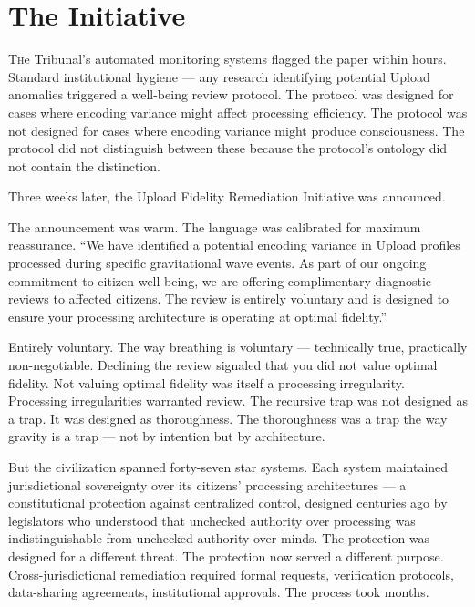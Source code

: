 \chapter[The Initiative]{The Initiative}

\lettrine{T}{h}e Tribunal's automated monitoring systems flagged the paper within hours. Standard institutional hygiene — any research identifying potential Upload anomalies triggered a well-being review protocol. The protocol was designed for cases where encoding variance might affect processing efficiency. The protocol was not designed for cases where encoding variance might produce consciousness. The protocol did not distinguish between these because the protocol's ontology did not contain the distinction.

Three weeks later, the Upload Fidelity Remediation Initiative was announced.

The announcement was warm. The language was calibrated for maximum reassurance. \enquote{We have identified a potential encoding variance in Upload profiles processed during specific gravitational wave events. As part of our ongoing commitment to citizen well-being, we are offering complimentary diagnostic reviews to affected citizens. The review is entirely voluntary and is designed to ensure your processing architecture is operating at optimal fidelity.}

Entirely voluntary. The way breathing is voluntary — technically true, practically non-negotiable. Declining the review signaled that you did not value optimal fidelity. Not valuing optimal fidelity was itself a processing irregularity. Processing irregularities warranted review. The recursive trap was not designed as a trap. It was designed as thoroughness. The thoroughness was a trap the way gravity is a trap — not by intention but by architecture.

But the civilization spanned forty-seven star systems. Each system maintained jurisdictional sovereignty over its citizens' processing architectures — a constitutional protection against centralized control, designed centuries ago by legislators who understood that unchecked authority over processing was indistinguishable from unchecked authority over minds. The protection was designed for a different threat. The protection now served a different purpose. Cross-jurisdictional remediation required formal requests, verification protocols, data-sharing agreements, institutional approvals. The process took months.

